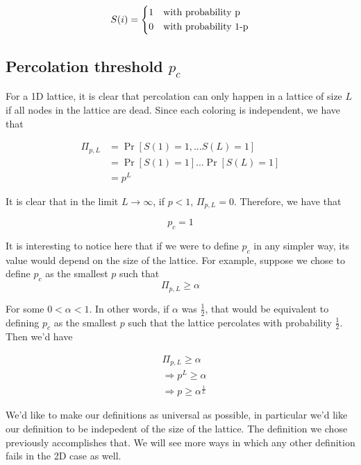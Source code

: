 $$
	S(i) =
    \begin{dcases}
        1 & \text{with probability p} \\
        0 & \text{with probability 1-p} \\
    \end{dcases}
$$

\subsection{Percolation threshold $p_c$}

For a 1D lattice, it is clear that percolation can only happen in a lattice of size $L$ if all nodes in the lattice are dead. Since each coloring is independent, we have that

\begin{equation}
	\begin{split}
		\Pi_{p,L} & = \Pr[S(1) = 1, ... S(L) = 1] \\
				  &	=  \Pr[S(1) = 1]...\Pr[S(L) = 1] \\
				  & =  p^L
	\end{split}
\end{equation}

It is clear that in the limit $L \rightarrow \infty $, if $p < 1$, $\Pi_{p,L} = 0$.
Therefore, we have that

$$
p_c = 1
$$


It is interesting to notice here that if we were to define $p_c$ in any simpler way, its value would depend on the size of the lattice. For example, suppose we chose to define $p_c$ as the smallest $p$ such that
$$
  \Pi_{p,L} \geq \alpha
$$

For some $0 < \alpha < 1$. In other words, if $\alpha$ was $\frac{1}{2}$, that would be equivalent to defining $p_c$ as the smallest $p$ such that the lattice percolates with probability $\frac{1}{2}$. Then we'd have

\[
\begin{split}
  & \Pi_{p,L}  \geq \alpha \\
  & \Rightarrow p^L \geq \alpha \\
  & \Rightarrow p \geq \alpha^{\frac{1}{L}}
\end{split}
\]

We'd like to make our definitions as universal as possible, in particular we'd like our definition to be indepedent of the size of the lattice. The definition we chose previously accomplishes that. We will see more ways in which any other definition fails in the 2D case as well.

